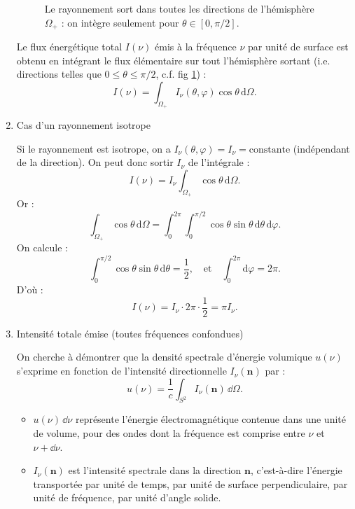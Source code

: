\documentclass[a4paper,10pt]{report}
\begin{document}
\begin{enumerate}
\begin{figure}[h!]
		\caption{Le rayonnement sort dans toutes les directions de l’hémisphère $\Omega_+$ : on intègre seulement pour $\theta \in [0, \pi/2]$.}
		\label{fig:sortant}
	\end{figure}
	Le flux énergétique total $I(\nu)$ émis à la fréquence $\nu$ par unité de surface est obtenu en intégrant le flux élémentaire sur tout l’hémisphère sortant (i.e. directions telles que $0 \leq \theta \leq \pi/2$, c.f. fig \ref{fig:sortant}) :
	\[
	I(\nu) = \int_{\Omega_+} I_\nu(\theta, \varphi) \cos\theta \, \text{d}\Omega.
	\]



	\item {Cas d’un rayonnement isotrope}
	
	Si le rayonnement est isotrope, on a $I_\nu(\theta, \varphi) = I_\nu = \text{constante}$ (indépendant de la direction). On peut donc sortir $I_\nu$ de l’intégrale :
	\[
	I(\nu) = I_\nu \int_{\Omega_+} \cos\theta \, \text{d}\Omega.
	\]
	Or :
	\[
	\int_{\Omega_+} \cos\theta \, \text{d}\Omega = \int_0^{2\pi} \int_0^{\pi/2} \cos\theta \sin\theta \, \text{d}\theta \, \text{d}\varphi.
	\]
	On calcule :
	\[
	\int_0^{\pi/2} \cos\theta \sin\theta \, \text{d}\theta = \frac{1}{2},
	\quad \text{et} \quad \int_0^{2\pi} \text{d}\varphi = 2\pi.
	\]
	D’où :
	\[
	I(\nu) = I_\nu \cdot 2\pi \cdot \frac{1}{2} = \pi I_\nu.
	\]
	
	\item {Intensité totale émise (toutes fréquences confondues)}

	
	On cherche à démontrer que la densité spectrale d'énergie volumique $u(\nu)$ s'exprime en fonction de l'intensité directionnelle $I_\nu(\textbf{n})$ par :
	\[
	u(\nu) = \frac{1}{c} \int_{S^2} I_\nu(\textbf{n})\, \dd\Omega.
	\]

	\begin{itemize}
		\item $u(\nu)\, \dd\nu$ représente l'énergie électromagnétique contenue dans une unité de volume, pour des ondes dont la fréquence est comprise entre $\nu$ et $\nu + \dd\nu$.
		\item $I_\nu(\textbf{n})$ est l'intensité spectrale dans la direction $\textbf{n}$, c’est-à-dire l’énergie transportée par unité de temps, par unité de surface perpendiculaire, par unité de fréquence, par unité d’angle solide.
	\end{itemize}
	

\end{enumerate}
\end{document}

